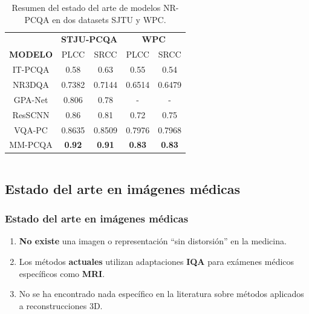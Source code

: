 \begin{frame}
\begin{columns}
      \begin{table}[htp]
          \footnotesize
          \centering
          \begin{tabular}{|c|c|c|c|c|}
              \hline
              \rowcolor[HTML]{FFC702}
              \cellcolor[HTML]{FFC702} & \multicolumn{2}{c|}{\cellcolor[HTML]{FFC702}\textbf{STJU-PCQA}} & \multicolumn{2}{c|}{\cellcolor[HTML]{FFC702}\textbf{WPC}} \\ 
              \cline{2-5}
             \multirow{-2}{*}{\cellcolor[HTML]{FFC702}\textbf{MODELO}}  &\multicolumn{1}{c|}{\cellcolor[HTML]{FFC702} PLCC} & \multicolumn{1}{c|}{\cellcolor[HTML]{FFC702}SRCC} & \multicolumn{1}{c|}{\cellcolor[HTML]{FFC702}PLCC} & \multicolumn{1}{c|}{\cellcolor[HTML]{FFC702}SRCC} \\
              \hline
              IT-PCQA & 0.58 & 0.63 & 0.55  & 0.54\\
              \hline
              \alert<3->{NR3DQA} & 0.7382 & 0.7144 & 0.6514 & 0.6479\\
              \hline
              GPA-Net & 0.806 & 0.78 & - & - \\
              \hline
              ResSCNN & 0.86 & 0.81 & 0.72 & 0.75\\
              \hline
              \alert<4->{VQA-PC} & 0.8635 & 0.8509 & 0.7976 & 0.7968\\
              \hline
              MM-PCQA & \textbf{0.92} & \textbf{0.91} & \textbf{0.83} & \textbf{0.83}\\
              \hline
          \end{tabular}
          \caption[Estado del arte de modelos NR-PCQA]{
          Resumen del estado del arte de modelos NR-PCQA en dos datasets SJTU y WPC.
        }
      \end{table}
  \end{columns}
\end{frame}

\subsection{Estado del arte en imágenes médicas}
\begin{frame}
  \frametitle{Estado del arte en imágenes médicas}
  \begin{enumerate}
    \item \textbf{No existe} una imagen o representación \alert{``sin distorsión''} en la medicina.
    \item Los métodos \textbf{actuales} utilizan adaptaciones \textbf{IQA} para 
      exámenes médicos específicos como \textbf{MRI}.
    \item No se ha encontrado nada específico en la literatura sobre 
      métodos aplicados a reconstrucciones 3D.
  \end{enumerate}
\end{frame}
